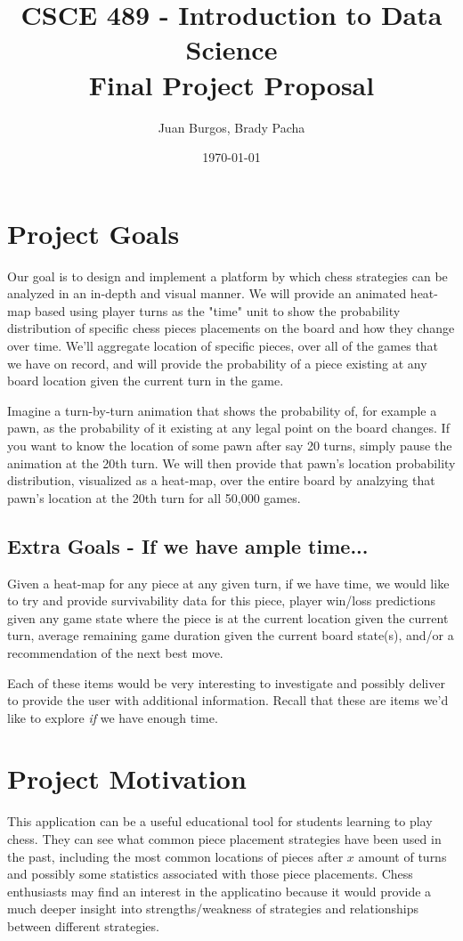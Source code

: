 \documentclass[a4paper,10pt,oneside,leqno,titlepage,onecolumn]{article}
\title{CSCE 489 - Introduction to Data Science \\ Final Project Proposal}
\author{Juan Burgos, Brady Pacha}
\date{\today}
\begin{document}
\maketitle

\section*{Project Goals}
Our goal is to design and implement a platform by which chess strategies can be analyzed in an in-depth and visual manner. We will provide an animated heat-map based using player turns as the "time" unit to show the probability distribution of specific chess pieces placements on the board and how they change over time. We'll aggregate location of specific pieces, over all of the games that we have on record, and will provide the probability of a piece existing at any board location given the current turn in the game. 

Imagine a turn-by-turn animation that shows the probability of, for example a pawn, as the probability of it existing at any legal point on the board changes. If you want to know the location of some pawn after say 20 turns, simply pause the animation at the 20th turn. We will then provide that pawn's location probability distribution, visualized as a heat-map, over the entire board by analzying that pawn's location at the 20th turn for all 50,000 games.

\subsection*{Extra Goals - If we have ample time...}
Given a heat-map for any piece at any given turn, if we have time, we would like to try and provide survivability data for this piece, player win/loss predictions given any game state where the piece is at the current location given the current turn, average remaining game duration given the current board state(s), and/or a recommendation of the next best move.

Each of these items would be very interesting to investigate and possibly deliver to provide the user with additional information. Recall that these are items we'd like to explore \emph{if} we have enough time.


\section*{Project Motivation}
This application can be a useful educational tool for students learning to play chess. They can see what common piece placement strategies have been used in the past, including the most common locations of pieces after $x$ amount of turns and possibly some statistics associated with those piece placements. Chess enthusiasts may find an interest in the applicatino because it would provide a much deeper insight into strengths/weakness of strategies and relationships between different strategies.
\end{document}
